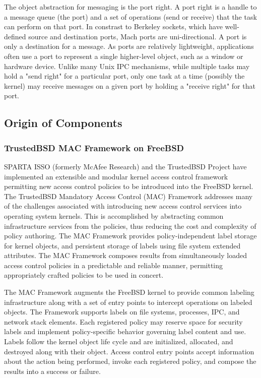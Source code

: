 The object abstraction for messaging is the port right. A port right
is a handle to a message queue (the port) and a set of operations
(send or receive) that the task can perform on that port. In constrast
to Berkeley sockets, which have well-defined source and destination
ports, Mach ports are uni-directional. A port is only a destination
for a message.  As ports are relatively lightweight, applications
often use a port to represent a single higher-level object, such
as a window or hardware device.  Unlike many Unix IPC mechanisms,
while multiple tasks may hold a "send right" for a particular port,
only one task at a time (possibly the kernel) may receive messages
on a given port by holding a "receive right" for that port.

\subsection{Origin of Components}
\subsubsection{TrustedBSD MAC Framework on FreeBSD}

SPARTA ISSO (formerly McAfee Research) and the TrustedBSD Project
have implemented an extensible and modular kernel access control
framework permitting new access control policies to be introduced
into the FreeBSD kernel\cite{trustedbsd, bsdcon2000trustedbsd,
watson01, discex3, watson03}.  The TrustedBSD Mandatory Access
Control (MAC) Framework addresses many of the challenges associated
with introducing new access control services into operating system
kernels.  This is accomplished by abstracting common infrastructure
services from the policies, thus reducing the cost and complexity
of policy authoring.  The MAC Framework provides policy-independent
label storage for kernel objects, and persistent storage of labels
using file system extended attributes.  The MAC Framework composes
results from simultaneously loaded access control policies in a
predictable and reliable manner, permitting appropriately crafted
policies to be used in concert.

The MAC Framework augments the FreeBSD kernel to provide common
labeling infrastructure along with a set of entry points to intercept
operations on labeled objects.  The Framework supports labels on
file systems, processes, IPC, and network stack elements.  Each
registered policy may reserve space for security labels and implement
policy-specific behavior governing label content and use.  Labels
follow the kernel object life cycle and are initialized, allocated,
and destroyed along with their object.  Access control entry points
accept information about the action being performed, invoke each
registered policy, and compose the results into a success or failure.

